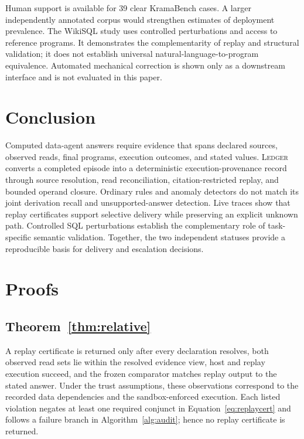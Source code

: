 \documentclass[5p,times]{elsarticle}
\newcommand{\ledger}{\textsc{Ledger}\xspace}
\begin{document}
Human support is available for 39 clear KramaBench cases. A larger independently annotated corpus would strengthen estimates of deployment prevalence. The WikiSQL study uses controlled perturbations and access to reference programs. It demonstrates the complementarity of replay and structural validation; it does not establish universal natural-language-to-program equivalence. Automated mechanical correction is shown only as a downstream interface and is not evaluated in this paper.

\section{Conclusion}\label{sec:conclusion}

Computed data-agent answers require evidence that spans declared sources, observed reads, final programs, execution outcomes, and stated values. \ledger converts a completed episode into a deterministic execution-provenance record through source resolution, read reconciliation, citation-restricted replay, and bounded operand closure. Ordinary rules and anomaly detectors do not match its joint derivation recall and unsupported-answer detection. Live traces show that replay certificates support selective delivery while preserving an explicit unknown path. Controlled SQL perturbations establish the complementary role of task-specific semantic validation. Together, the two independent statuses provide a reproducible basis for delivery and escalation decisions.

\appendix
\section{Proofs}\label{app:proofs}

\subsection{Theorem~\ref{thm:relative}}
A replay certificate is returned only after every declaration resolves, both observed read sets lie within the resolved evidence view, host and replay execution succeed, and the frozen comparator matches replay output to the stated answer. Under the trust assumptions, these observations correspond to the recorded data dependencies and the sandbox-enforced execution. Each listed violation negates at least one required conjunct in Equation~\ref{eq:replaycert} and follows a failure branch in Algorithm~\ref{alg:audit}; hence no replay certificate is returned.
\end{document}
